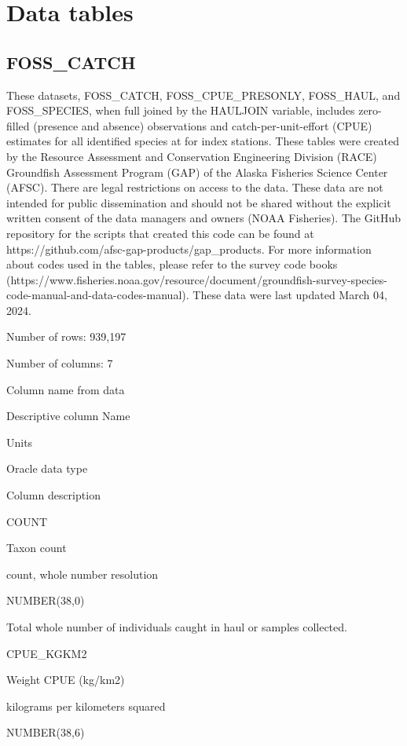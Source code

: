 \documentclass[
  letterpaper,
  oneside,
  open=any]{scrbook}
\begin{document}
\hypertarget{data-tables-2}{%
\section{Data tables}\label{data-tables-2}}

\hypertarget{foss_catch}{%
\subsection{FOSS\_CATCH}\label{foss_catch}}

These datasets, FOSS\_CATCH, FOSS\_CPUE\_PRESONLY, FOSS\_HAUL, and
FOSS\_SPECIES, when full joined by the HAULJOIN variable, includes
zero-filled (presence and absence) observations and
catch-per-unit-effort (CPUE) estimates for all identified species at for
index stations. These tables were created by the Resource Assessment and
Conservation Engineering Division (RACE) Groundfish Assessment Program
(GAP) of the Alaska Fisheries Science Center (AFSC). There are legal
restrictions on access to the data. These data are not intended for
public dissemination and should not be shared without the explicit
written consent of the data managers and owners (NOAA Fisheries). The
GitHub repository for the scripts that created this code can be found at
https://github.com/afsc-gap-products/gap\_products. For more information
about codes used in the tables, please refer to the survey code books
(https://www.fisheries.noaa.gov/resource/document/groundfish-survey-species-code-manual-and-data-codes-manual).
These data were last updated March 04, 2024.

Number of rows: 939,197

Number of columns: 7

Column name from data

Descriptive column Name

Units

Oracle data type

Column description

COUNT

Taxon count

count, whole number resolution

NUMBER(38,0)

Total whole number of individuals caught in haul or samples collected.

CPUE\_KGKM2

Weight CPUE (kg/km2)

kilograms per kilometers squared

NUMBER(38,6)
\end{document}
